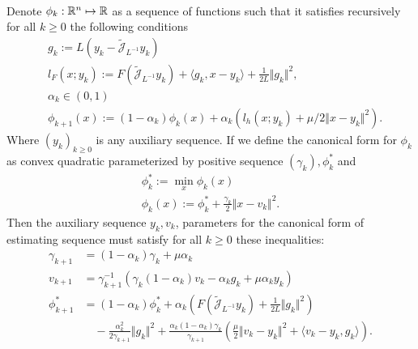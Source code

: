 \documentclass[12pt]{article}
\begin{document}
    \begin{theorem}
    \label{thm:canon-prox-grad-est-seq}
        \; \\
        Denote $\phi_k:\mathbb R^n \mapsto \mathbb R$ as a sequence of functions such that it satisfies recursively for all $k\ge 0$ the following conditions 
        \begin{align*}
            & g_k := L(y_k - \widetilde{\mathcal J}_{L^{-1}} y_k)
            \\
            & l_F(x; y_k) := 
                F\left(\widetilde{\mathcal J}_{L^{-1}} y_k\right) 
                + \langle g_k, x - y_k\rangle 
                + \frac{1}{2L}\Vert g_k\Vert^2, 
            \\
            & \alpha_k \in (0, 1)
            \\
            & 
            \phi_{k + 1}(x)
            := (1 - \alpha_k)\phi_k (x) + 
            \alpha_k (l_h(x; y_k) + \mu/2\Vert x - y_k\Vert^2). 
        \end{align*}
        Where $(y_k)_{k\ge 0}$ is any auxiliary sequence. 
        If we define the canonical form for $\phi_k$ as convex quadratic parameterized by positive sequence $(\gamma_k), \phi_k^*$ and 
        \begin{align*}
            \phi_k^* := \min_{x} \phi_k(x)
            \\
            \phi_k(x) := \phi_k^* + \frac{\gamma_k}{2}\Vert x - v_k\Vert^2.
        \end{align*}
        Then the auxiliary sequence $y_k, v_k$, parameters for the canonical form of estimating sequence must satisfy for all $k\ge 0$ these inequalities: 
        {\small
        \begin{align*}      
            \gamma_{k + 1} &= (1 - \alpha_k) \gamma_k + \mu \alpha_k
            \\
            v_{k + 1} &= \gamma_{k + 1}^{-1}
            (\gamma_k(1 - \alpha_k)v_k - \alpha_k g_k + \mu \alpha_k y_k)
            \\
            \phi_{k + 1}^* &= 
            (1 - \alpha_k)\phi_k^*
            + \alpha_k\left(
                F\left(\widetilde{\mathcal J}_{L^{-1}} y_k\right) 
                + \frac{1}{2L}\Vert g_k\Vert^2 
            \right) 
            \\
            &\quad 
            - \frac{\alpha_k^2}{2 \gamma_{k + 1}} \Vert g_k\Vert^2 
            + 
            \frac{\alpha_k(1 - \alpha_k)\gamma_k}{\gamma_{k + 1}} 
            \left(
                \frac{\mu}{2}\Vert v_k - y_k\Vert^2 
                + \langle v_k - y_k , g_k\rangle
            \right). 
        \end{align*}
        }
    \end{theorem}
\end{document}
